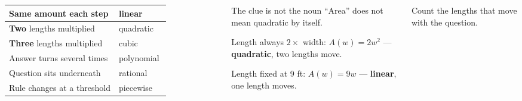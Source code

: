 \documentclass[aspectratio=169, 11pt]{beamer}
\begin{document}
\begin{frame}[t, plain]

  \begin{columns}[T, onlytextwidth]
      \renewcommand{\arraystretch}{1.25}
      \begin{tabular}{@{}p{0.68\linewidth}l@{}}
        \hline
        Same amount each step & linear \\
        \hline
        \textbf{Two} lengths multiplied & quadratic \\
        \hline
        \textbf{Three} lengths multiplied & cubic \\
        \hline
        Answer turns several times & polynomial \\
        \hline
        Question sits underneath & rational \\
        \hline
        Rule changes at a threshold & piecewise \\
        \hline
      \end{tabular}

      \begin{block}{The clue is not the noun}
        ``Area'' does not mean quadratic by itself.

        \smallskip
        Length always \(2\times\) width: \(A(w) = 2w^2\) ---
        \textbf{quadratic}, two lengths move.

        \smallskip
        Length fixed at 9 ft: \(A(w) = 9w\) --- \textbf{linear}, one length
        moves.
      \end{block}

      \medskip
      \begin{center}
        Count the lengths that move with the question.
      \end{center}
  \end{columns}
\end{frame}
\end{document}
